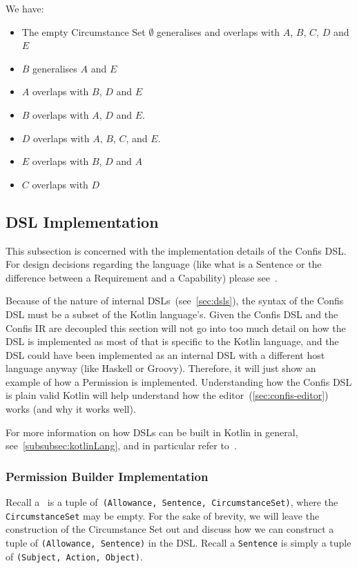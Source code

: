 We have:
\begin{itemize}
    \item The empty Circumstance Set $\emptyset$ generalises and overlaps with $A$, $B$, $C$, $D$ and $E$
    \item $B$ generalises $A$ and $E$
    \item $A$ overlaps with $B$, $D$ and $E$
    \item $B$ overlaps with $A$, $D$ and $E$.
    \item $D$ overlaps with $A$, $B$, $C$, and $E$.
    \item $E$ overlaps with $B$, $D$ and $A$
    \item $C$ overlaps with $D$
\end{itemize}

\subsection{DSL Implementation}\label{subsec:dsl-implementation}

This subsection is concerned with the implementation details of the Confis DSL.
For design decisions regarding the language (like what is a Sentence or the difference between a Requirement and a Capability) please see~.

Because of the nature of internal DSLs~(see~\autoref{sec:dsls}), the syntax of the Confis DSL must be a subset of the Kotlin language's.
Given the Confis DSL and the Confis IR are decoupled this section will not go into too much detail on how the DSL is implemented as most of that is specific to the Kotlin language, and the DSL could have been implemented as an internal DSL with a different host language anyway (like Haskell or Groovy).
Therefore, it will just show an example of how a Permission is implemented.
Understanding how the Confis DSL is plain valid Kotlin will help understand how the editor~(\autoref{sec:confis-editor}) works (and why it works well).

For more information on how DSLs can be built in Kotlin in general, see~\autoref{subsubsec:kotlinLang}, and in particular refer to~\cite{kotlinTypeSafeBuilders}.

\subsubsection{Permission Builder Implementation}

Recall a~ is a tuple of~\texttt{(Allowance, Sentence, CircumstanceSet)}, where the \texttt{CircumstanceSet} may be empty.
For the sake of brevity, we will leave the construction of the Circumstance Set out and discuss how we can construct a tuple of \texttt{(Allowance, Sentence)} in the DSL.
Recall a \texttt{Sentence} is simply a tuple of \texttt{(Subject, Action, Object)}.

